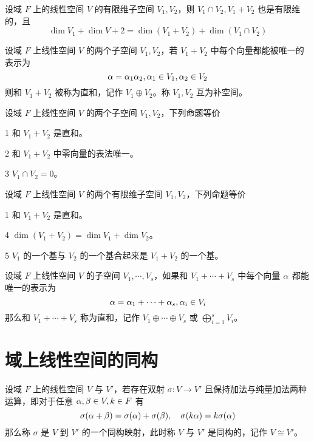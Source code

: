 \begin{theorem}
    设域 $F$ 上的线性空间 $V$ 的有限维子空间 $V_1,V_2$，则 $V_1 \cap V_2, V_1+V_2$ 也是有限维的，且
    \[ \dim V_1 + \dim V+2 = \dim(V_1+V_2) + \dim(V_1 \cap V_2) \]
\end{theorem}

\begin{definition}[直和]
    设域 $F$ 上线性空间 $V$ 的两个子空间 $V_1,V_2$，若 $V_1+V_2$ 中每个向量都能被唯一的表示为
    \[ \alpha = \alpha_1 \alpha_2, \alpha_1 \in V_1, \alpha_2 \in V_2 \]
    则和 $V_1+V_2$ 被称为直和，记作 $V_1 \oplus V_2$。称 $V_1,V_2$ 互为补空间。 
\end{definition}

\begin{theorem}
    设域 $F$ 上线性空间 $V$ 的两个子空间 $V_1,V_2$，下列命题等价

    \num{1} 和 $V_1+V_2$ 是直和。

    \num{2} 和 $V_1+V_2$ 中零向量的表法唯一。

    \num{3} $V_1 \cap V_2 = 0$。
\end{theorem}

\begin{theorem}
    设域 $F$ 上线性空间 $V$ 的两个有限维子空间 $V_1,V_2$，下列命题等价

    \num{1} 和 $V_1+V_2$ 是直和。

    \num{4} $\dim(V_1+V_2) = \dim V_1 + \dim V_2$。

    \num{5} $V_1$ 的一个基与 $V_2$ 的一个基合起来是 $V_1+V_2$ 的一个基。
\end{theorem}

\begin{definition}
    设域 $F$ 上线性空间 $V$ 的子空间 $V_1,\cdots,V_s$，如果和 $V_1+\cdots+V_s$ 中每个向量 $\alpha$ 都能唯一的表示为
    \[ \alpha = \alpha_1 + \cdots + \alpha_s, \alpha_i \in V_i \]
    那么和 $V_1 + \cdots + V_s$ 称为直和，记作 $V_1 \oplus \cdots \oplus V_s$ 或 $\displaystyle\bigoplus_{i=1}^s V_i$。
\end{definition}

\section{域上线性空间的同构}

\begin{definition}[同构]
    设域 $F$ 上的线性空间 $V$ 与 $V'$，若存在双射 $\sigma : V \to V'$ 且保持加法与纯量加法两种运算，即对于任意 $\alpha,\beta \in V,k\in F$ 有
    \[ \sigma(\alpha+\beta) = \sigma(\alpha) + \sigma(\beta), \quad \sigma(k\alpha) = k\sigma(\alpha) \]
    那么称 $\sigma$ 是 $V$ 到 $V'$ 的一个同构映射，此时称 $V$ 与 $V'$ 是同构的，记作 $V \cong V'$。
\end{definition}

